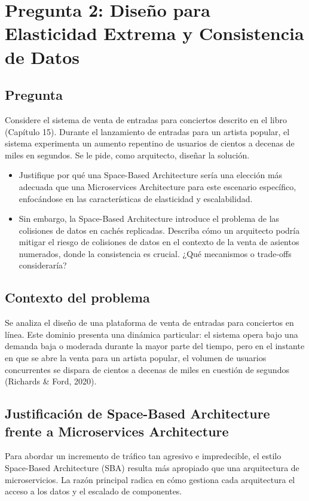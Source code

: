 \documentclass[12pt, a4paper]{article}
\begin{document}
    \section[Diseño para Elasticidad Extrema y Consistencia de Datos]{Pregunta 2: Diseño para Elasticidad Extrema y Consistencia de Datos}
    \subsection{Pregunta}
    Considere el sistema de venta de entradas para conciertos descrito en el libro (Capítulo 15). Durante el lanzamiento de entradas para un artista popular, el sistema experimenta un aumento repentino de usuarios de cientos a decenas de miles en segundos. Se le pide, como arquitecto, diseñar la solución.

    \begin{itemize}
        \item Justifique por qué una Space-Based Architecture sería una elección más adecuada que una Microservices Architecture para este escenario específico, enfocándose en las características de elasticidad y escalabilidad.
        \item Sin embargo, la Space-Based Architecture introduce el problema de las colisiones de datos en cachés replicadas. Describa cómo un arquitecto podría mitigar el riesgo de colisiones de datos en el contexto de la venta de asientos numerados, donde la consistencia es crucial. ¿Qué mecanismos o trade-offs consideraría?
    \end{itemize}

    \subsection{Contexto del problema}


    Se analiza el diseño de una plataforma de venta de entradas para conciertos en línea. Este dominio presenta una dinámica particular: el sistema opera bajo una demanda baja o moderada durante la mayor parte del tiempo, pero en el instante en que se abre la venta para un artista popular, el volumen de usuarios concurrentes se dispara de cientos a decenas de miles en cuestión de segundos (Richards \& Ford, 2020).
    \subsection{Justificación de Space-Based Architecture frente a Microservices Architecture}
    Para abordar un incremento de tráfico tan agresivo e impredecible, el estilo Space-Based Architecture (SBA) resulta más apropiado que una arquitectura de microservicios. La razón principal radica en cómo gestiona cada arquitectura el acceso a los datos y el escalado de componentes.
\end{document}

